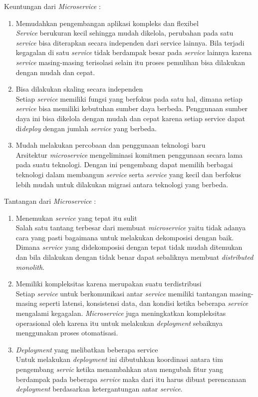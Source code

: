 Keuntungan dari \textit{Microservice}  \cite{ECD,BC4,1C7}:
\begin{enumerate}[leftmargin=1.3cm]
	\item Memudahkan pengembangan aplikasi kompleks dan flexibel\\
	\textit{Service} berukuran kecil sehingga mudah dikelola, perubahan pada satu \textit{service} bisa diterapkan secara independen dari service lainnya. Bila terjadi kegagalan di satu \textit{service} tidak berdampak besar pada \textit{service} lainnya karena \textit{service} masing-masing terisolasi selain itu proses pemulihan bisa dilakukan dengan mudah dan cepat.
	\item Bisa dilakukan skaling secara independen\\ 
	Setiap \textit{service} memiliki fungsi yang berfokus pada satu hal,  dimana setiap \textit{service} bisa memiliki kebutuhan sumber daya berbeda. Penggunaan sumber daya ini bisa dikelola dengan mudah dan cepat karena setiap service dapat di\textit{deploy} dengan jumlah \textit{service} yang berbeda.
	\item Mudah melakukan percobaan dan penggunaan teknologi baru\\
	Arsitektur \textit{microservice} mengeliminasi komitmen penggunaan secara lama pada suatu teknologi. Dengan ini pengembang dapat memilih berbagai teknologi dalam membangun \textit{service} serta \textit{service} yang kecil dan berfokus lebih mudah untuk dilakukan migrasi antara teknologi yang berbeda. 
\end{enumerate}	

Tantangan dari \textit{Microservice}  \cite{ECD,BC4,1C7}:
\begin{enumerate}[leftmargin=1.3cm]
	\item Menemukan \textit{service} yang tepat itu sulit\\
	Salah satu tantang terbesar dari membuat \textit{microservice} yaitu tidak adanya cara yang pasti bagaimana untuk melakukan dekomposisi dengan baik. Dimana \textit{service} yang didekomposisi dengan tepat tidak mudah ditemukan dan bila dilakukan dengan tidak benar dapat sebaliknya membuat \textit{distributed monolith}. 
	\item Memiliki kompleksitas karena merupakan suatu terdistribusi\\
	Setiap \textit{service} untuk berkomunikasi antar \textit{service} memiliki tantangan masing-masing seperti latensi, konsistensi data, dan kondisi ketika beberapa \textit{service} mengalami kegagalan. \textit{Microservice} juga meningkatkan kompleksitas operasional oleh karena itu untuk melakukan \textit{deployment} sebaiknya menggunakan proses otomatisasi.
	\item \textit{Deployment} yang melibatkan beberapa service\\
	Untuk melakukan \textit{deployment} ini dibutuhkan koordinasi antara tim pengembang \textit{servic} ketika menambahkan atau mengubah fitur yang berdampak pada beberapa \textit{service} maka dari itu harus dibuat perencanaan \textit{deployment} berdasarkan ketergantungan antar \textit{service}.
\end{enumerate}	

